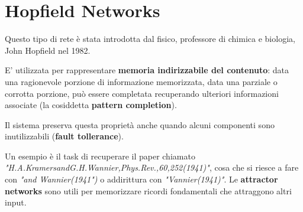 \chapter{Hopfield Networks}
Questo tipo di rete è stata introdotta dal fisico, professore di chimica e biologia, John Hopfield nel 1982.



E' utilizzata per rappresentare \textbf{memoria indirizzabile del contenuto}: data una ragionevole porzione di informazione memorizzata, data una parziale o corrotta porzione, può essere completata recuperando ulteriori informazioni associate (la cosiddetta \textbf{pattern completion}). 


Il sistema preserva questa proprietà anche quando alcuni componenti sono inutilizzabili (\textbf{fault tollerance}).


Un esempio è il task di recuperare il paper chiamato \\
\textit{"H.A.KramersandG.H.Wannier,Phys.Rev.,60,252(1941)"}, cosa che si riesce a fare con \textit{"and Wannier(1941")} o addirittura con \textit{"Vannier(1941)"}.
\newline
\newline
Le \textbf{attractor networks} sono utili per memorizzare ricordi fondamentali che attraggono altri input. 



